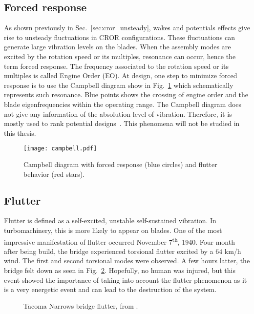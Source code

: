 
\subsection{Forced response}
\label{sub:forced_response}

As shown previously in Sec.~\ref{sec:cror_unsteady}, wakes and
potentials effects give rise to unsteady fluctuations in 
CROR configurations. These fluctuations 
can generate large vibration levels on the blades.
When the assembly modes are excited by the rotation speed
or its multiples, resonance can occur,
hence the term forced response. 
The frequency associated to the rotation speed or its multiples
is called Engine Order (EO).
At design, one step to minimize forced response is
to use the Campbell diagram show in Fig.~\ref{fig:campbell}
which schematically represents such resonance.
Blue points shows the crossing of engine order and 
the blade eigenfrequencies within the operating range. 
The Campbell diagram does not give any information of
the absolution level of vibration. Therefore, it is mostly
used to rank potential designs~\cite{Marshall1996}. This phenomena
will not be studied in this thesis.
\begin{figure}[htp]
  \centering
  \texttt{[image: campbell.pdf]}
  \caption{Campbell diagram with forced response (blue circles)
  and flutter behavior (red stars).}
  \label{fig:campbell}
\end{figure}


\subsection{Flutter}
\label{sub:flutter}

Flutter is defined as a self-excited, unstable 
self-sustained vibration. In turbomachinery, this is
more likely to appear on blades.
One of the most impressive
manifestation of flutter occurred November 7\textsuperscript{th}, 1940.
Four month after being build, the bridge experienced 
torsional flutter excited by a $64$ \mbox{km/h} wind.
The first and second torsional modes were observed.
A few hours latter, the bridge felt down as seen in 
Fig.~\ref{fig:tacoma_bridge}. Hopefully, no human
was injured, but this event showed the importance
of taking into account the flutter phenomenon as
it is a very energetic event and can lead to the destruction of the system.
\begin{figure}[htp]
  \centering
  \caption{Tacoma Narrows bridge flutter, from \citet{Smith1974}.}
  \label{fig:tacoma_bridge}
\end{figure}

